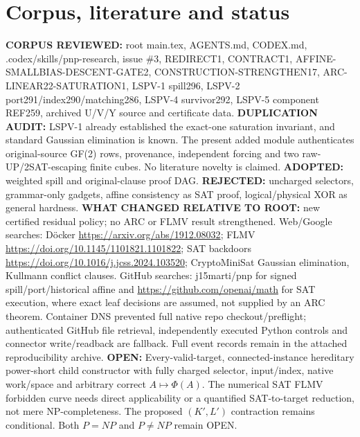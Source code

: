 \documentclass[11pt]{article}
\begin{document}
\section*{Corpus, literature and status}
\textbf{CORPUS REVIEWED:} root main.tex, AGENTS.md, CODEX.md, .codex/skills/pnp-research, issue \#3, REDIRECT1, CONTRACT1, AFFINE-SMALLBIAS-DESCENT-GATE2, CONSTRUCTION-STRENGTHEN17, ARC-LINEAR22-SATURATION1, LSPV-1 spill296, LSPV-2 port291/index290/matching286, LSPV-4 survivor292, LSPV-5 component REF259, archived U/V/Y source and certificate data. \textbf{DUPLICATION AUDIT:} LSPV-1 already established the exact-one saturation invariant, and standard Gaussian elimination is known. The present added module authenticates original-source GF(2) rows, provenance, independent forcing and two raw-UP/2SAT-escaping finite cubes. No literature novelty is claimed. \textbf{ADOPTED:} weighted spill and original-clause proof DAG. \textbf{REJECTED:} uncharged selectors, grammar-only gadgets, affine consistency as SAT proof, logical/physical XOR as general hardness. \textbf{WHAT CHANGED RELATIVE TO ROOT:} new certified residual policy; no ARC or FLMV result strengthened.
Web/Google searches: D\"ocker \url{https://arxiv.org/abs/1912.08032}; FLMV \url{https://doi.org/10.1145/1101821.1101822}; SAT backdoors \url{https://doi.org/10.1016/j.jcss.2024.103520}; CryptoMiniSat Gaussian elimination, Kullmann conflict clauses. GitHub searches: j15marti/pnp for signed spill/port/historical affine and \url{https://github.com/openai/math} for SAT execution, where exact leaf decisions are assumed, not supplied by an ARC theorem. Container DNS prevented full native repo checkout/preflight; authenticated GitHub file retrieval, independently executed Python controls and connector write/readback are fallback. Full event records remain in the attached reproducibility archive.
\textbf{OPEN:} Every-valid-target, connected-instance hereditary power-short child constructor with fully charged selector, input/index, native work/space and arbitrary correct $A\mapsto\Phi(A)$. The numerical SAT FLMV forbidden curve needs direct applicability or a quantified SAT-to-target reduction, not mere NP-completeness. The proposed $(K',L')$ contraction remains conditional. Both $P=NP$ and $P\ne NP$ remain OPEN.
\end{document}
